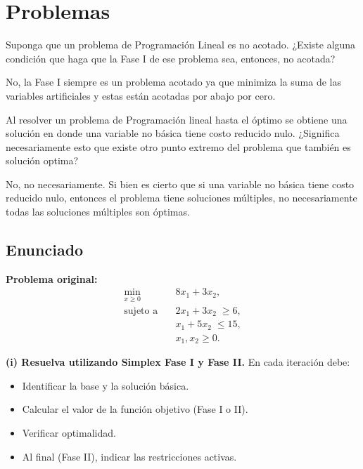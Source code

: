 \documentclass{article}
\newenvironment{question}
{\begin{mdframed}[backgroundcolor=white]}
{\end{mdframed}}
\newenvironment{solution}
{\begin{mdframed}[backgroundcolor=lightorange,hidealllines=true]}
{\end{mdframed}}
\begin{document}
\section{Problemas}

\begin{question}
    Suponga que un problema de Programación Lineal es no acotado. ¿Existe alguna condición que haga que la Fase I de ese problema sea, entonces, no acotada?
\end{question}

\begin{solution}
    No, la Fase I siempre es un problema acotado ya que minimiza la suma de las variables artificiales y estas están acotadas por abajo por cero.
\end{solution}

\begin{question}
    Al resolver un problema de Programación lineal hasta el óptimo se obtiene una solución en donde una variable no básica tiene costo reducido nulo. ¿Significa necesariamente esto que existe otro punto extremo del problema que también es solución optima?
\end{question}

\begin{solution}
    No, no necesariamente. Si bien es cierto que si una variable no básica tiene costo reducido nulo, entonces el problema tiene soluciones múltiples, no necesariamente todas las soluciones múltiples son óptimas.
\end{solution}

\subsection*{Enunciado}

\textbf{Problema original:}
\[
\begin{aligned}
\min_{x\ge0}\ &8x_1 + 3x_2,\\
\text{sujeto a}\quad
&2x_1 + 3x_2 \;\ge 6,\\
&x_1 + 5x_2 \;\le 15,\\
&x_1, x_2 \ge 0.
\end{aligned}
\]

\bigskip

\textbf{(i) Resuelva utilizando Simplex Fase I y Fase II.} En cada iteración debe:
\begin{itemize}
  \item Identificar la base y la solución básica.
  \item Calcular el valor de la función objetivo (Fase I o II).
  \item Verificar optimalidad.
  \item Al final (Fase II), indicar las restricciones activas.
\end{itemize}
\end{document}

